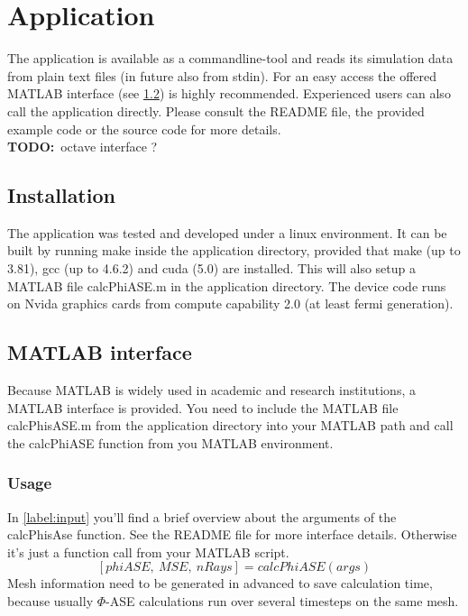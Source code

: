 \section{Application}

The application is available as a commandline-tool and reads
its simulation data from plain text files (in future also from stdin).
For an easy access the offered MATLAB interface (see \ref{label:matlab_interface}) 
is highly recommended. Experienced users can also call the application
directly. Please consult the README file, the provided 
example code or the source code for more details.\\
\textbf{TODO:}~octave interface ?

\subsection{Installation}
The application was tested and developed under a linux environment.
It can be built by running make inside the application directory, provided
that make (up to 3.81), gcc (up to 4.6.2) and cuda (5.0) are installed. 
This will also setup a MATLAB file calcPhiASE.m in the application
directory. The device code runs on Nvida graphics cards from compute 
capability 2.0 (at least fermi generation). 

\subsection{MATLAB interface}
\label{label:matlab_interface}
Because MATLAB is widely used in academic and research institutions, a MATLAB
interface is provided. You need to include the MATLAB file calcPhisASE.m from
the application directory into your MATLAB path and call the calcPhiASE function 
from you MATLAB environment.

\subsubsection{Usage}
In \ref{label:input} you'll find a brief overview about the
arguments of the calcPhisAse function. See the README file for 
more interface details. Otherwise it's just a function call from
your MATLAB script.
\[[phiASE,~MSE,~nRays] = calcPhiASE(args)\]
Mesh information need to be generated in advanced
to save calculation time, because usually $\Phi$-ASE calculations
run over several timesteps on the same mesh. 


